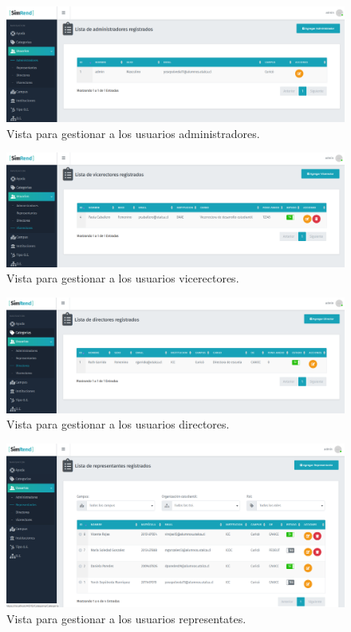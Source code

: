 \begin{figure}[h]
    \centering
    \includegraphics[width=1\textwidth]{Imagenes/CRUDAdministrador.PNG}
    \caption{\label{fig: CRUDAdministrador}Vista para gestionar a los usuarios administradores.}
\end{figure}

\begin{figure}[h]
    \centering
    \includegraphics[width=1\textwidth]{Imagenes/CRUDVicerrectores.PNG}
    \caption{\label{fig: CRUDVicerrectores}Vista para gestionar a los usuarios vicerectores.}
\end{figure}

\begin{figure}[h]
    \centering
    \includegraphics[width=1\textwidth]{Imagenes/CRUDDirectores.PNG}
    \caption{\label{fig: CRUDDirectores}Vista para gestionar a los usuarios directores.}
\end{figure}

\begin{figure}[h]
    \centering
    \includegraphics[width=1\textwidth]{Imagenes/CRUDRepresentante.PNG}
    \caption{\label{fig: CRUDRepresentante}Vista para gestionar a los usuarios representates.}
\end{figure}

